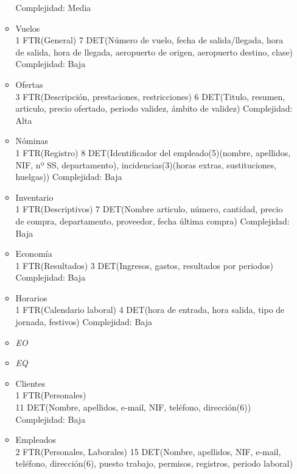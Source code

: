 \begin{enumerate}
\begin{itemize}
			Complejidad: Media\\
		\item Vuelos\\
			1 FTR(General)
			7 DET(Número de vuelo, fecha de salida/llegada, hora de salida, hora de llegada, aeropuerto de origen, aeropuerto destino,
			clase)
			Complejidad: Baja\\
		\item Ofertas\\
			3 FTR(Descripción, prestaciones, restricciones)
			6 DET(Titulo, resumen, articulo, precio ofertado, periodo validez, ámbito de validez)
			Complejidad: Alta\\
		\item Nóminas\\
			1 FTR(Registro)
			8 DET(Identificador del empleado(5)(nombre, apellidos, NIF, nº SS, departamento), incidencias(3)(horas extras,
			sustituciones, huelgas))
			Complejidad: Baja\\
		\item Inventario\\
			1 FTR(Descriptivos)
			7 DET(Nombre articulo, número, cantidad, precio de compra, departamento, proveedor, fecha última compra)
			Complejidad: Baja\\
		\item Economía\\
			1 FTR(Resultados)
			3 DET(Ingresos, gastos, resultados por periodos)
			Complejidad: Baja\\
		\item Horarios\\
			1 FTR(Calendario laboral)
			4 DET(hora de entrada, hora salida, tipo de jornada, festivos)
			Complejidad: Baja\\
	\end{itemize}
	\begin{itemize}
	\item \textsl{EO}
	\end{itemize}
	\begin{itemize}
	\item \textsl{EQ}
		\item Clientes \\
			1 FTR(Personales) \\
			11 DET(Nombre, apellidos, e-mail, NIF, teléfono, dirección(6)) \\
			Complejidad: Baja\\
		\item Empleados \\
			2 FTR(Personales, Laborales)
			15 DET(Nombre, apellidos, NIF, e-mail, teléfono, dirección(6), puesto trabajo, permisos, registros, periodo laboral)

\end{itemize}
\end{enumerate}
